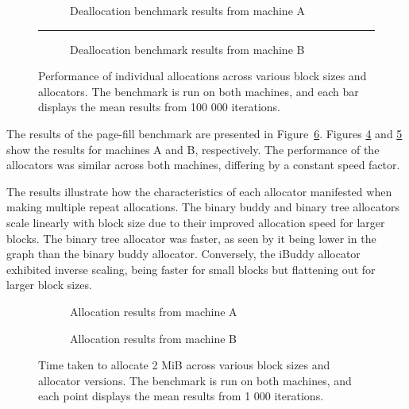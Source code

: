 \begin{figure}[h]
  \centering
  \begin{subfigure}{\textwidth}
    \centering
    \captionsetup{justification=centering}
    
    \caption{Deallocation benchmark results from machine A}
    \label{fig:deallocA}
  \end{subfigure}
  \rule{\textwidth}{0.1pt}
  \begin{subfigure}{\textwidth}
    \centering
    \captionsetup{justification=centering}
    
    \caption{Deallocation benchmark results from machine B}
    \label{fig:deallocB}
  \end{subfigure}
  \caption{Performance of individual allocations across various block sizes and allocators. The benchmark is run on both machines, and each bar displays the mean results from 100 000 iterations.}
  \label{fig:deallocbenchmark}
\end{figure}

\FloatBarrier

The results of the page-fill benchmark are presented in Figure~\ref{fig:allocpage}. Figures \ref{fig:allocpageA} and \ref{fig:allocpageB} show the results for machines A and B, respectively. The performance of the allocators was similar across both machines, differing by a constant speed factor.

The results illustrate how the characteristics of each allocator manifested when making multiple repeat allocations. The binary buddy and binary tree allocators scale linearly with block size due to their improved allocation speed for larger blocks. The binary tree allocator was faster, as seen by it being lower in the graph than the binary buddy allocator. Conversely, the iBuddy allocator exhibited inverse scaling, being faster for small blocks but flattening out for larger block sizes.

\begin{figure}[h]
  \centering
  \begin{subfigure}{0.496\textwidth}
    \centering
    \captionsetup{justification=centering}
    
    \caption{Allocation results from machine A}
    \label{fig:allocpageA}
  \end{subfigure}
  \begin{subfigure}{0.496\textwidth}
    \centering
    \captionsetup{justification=centering}
    
    \caption{Allocation results from machine B}
    \label{fig:allocpageB}
  \end{subfigure}
  \caption{Time taken to allocate 2 MiB across various block sizes and allocator versions. The benchmark is run on both machines, and each point displays the mean results from 1 000 iterations.}
  \label{fig:allocpage}
\end{figure}


